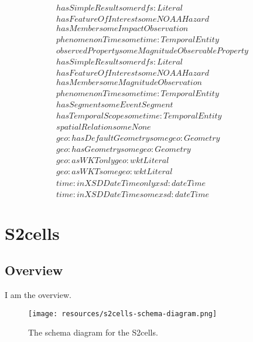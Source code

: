 \begin{align}
  hasSimpleResult some rdfs:Literal \\
  hasFeatureOfInterest some NOAAHazard \\
  hasMember some ImpactObservation \\
  phenomenonTime some time:TemporalEntity \\
  observedProperty some MagnitudeObservableProperty \\
  hasSimpleResult some rdfs:Literal \\
  hasFeatureOfInterest some NOAAHazard \\
  hasMember some MagnitudeObservation \\
  phenomenonTime some time:TemporalEntity \\
  hasSegment some EventSegment \\
  hasTemporalScope some time:TemporalEntity \\
  spatialRelation some None \\
  geo:hasDefaultGeometry some geo:Geometry \\
  geo:hasGeometry some geo:Geometry \\
  geo:asWKT only geo:wktLiteral \\
  geo:asWKT some geo:wktLiteral \\
  time:inXSDDateTime only xsd:dateTime \\
  time:inXSDDateTime some xsd:dateTime \end{align}



\section{S2cells}
\label{sec:s2cells}
\subsection{Overview}
\label{ssec:overview}

I am the overview.

\begin{figure}[h!]
  \begin{center}
    \texttt{[image: resources/s2cells-schema-diagram.png]}
  \end{center}
  \caption{The schema diagram for the S2cells.}
  \label{fig:ov-diagram}
\end{figure}


